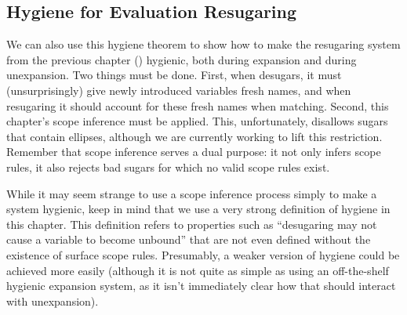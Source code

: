 \subsection{Hygiene for Evaluation Resugaring}
\label{sec:rscope-eval-hygiene}

We can also use this hygiene theorem to show how to make the
resugaring system from the previous chapter (\Resugarer) hygienic,
both during expansion and during unexpansion. Two things must be
done. First, when {\Resugarer} desugars, it must (unsurprisingly) give
newly introduced variables fresh names, and when resugaring it should
account for these fresh names when matching. Second, this chapter's scope
inference must be applied. This, unfortunately, disallows sugars that
contain ellipses, although we are currently working to lift this
restriction. Remember that scope inference serves a dual %
purpose: it not only infers scope rules, it also rejects bad sugars
for which no valid scope rules exist.

While it may seem strange to use a scope inference process simply to
make a system hygienic, keep in mind that we use a very strong
definition of hygiene in this chapter. This definition refers to
properties such as ``desugaring may not cause a variable to become
unbound'' that are not even defined without the existence of surface
scope rules. Presumably, a weaker version of hygiene could be
achieved more easily (although it is not quite as simple as using an
off-the-shelf hygienic expansion system, as it isn't immediately clear
how that should interact with unexpansion).

